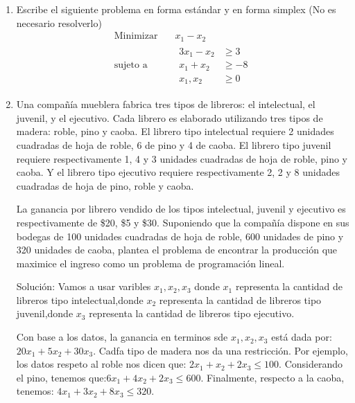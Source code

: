 \documentclass[twocolumn]{article}
\begin{document}
\begin{enumerate}
\item Escribe el siguiente problema en forma estándar y en forma simplex
(No es necesario resolverlo)
\begin{equation*}
\begin{aligned}
\text{Minimizar} \quad & x_{1}-x_{2}\\
\text{sujeto a} \quad &
  \begin{aligned}
   3x_{1}-x_{2} & \geq 3\\
   x_{1}+x_{2} &\geq -8\\
   x_{1},x_{2} &\geq 0
  \end{aligned}
\end{aligned}
\end{equation*}

\item Una compañía mueblera fabrica tres tipos de libreros: el
\guillemotleft{}intelectual\guillemotright{}, el \guillemotleft{}juvenil\guillemotright{}, y el \guillemotleft{}ejecutivo\guillemotright{}. Cada librero es
elaborado utilizando tres tipos de madera: roble, pino y caoba. El
librero tipo \guillemotleft{}intelectual\guillemotright{} requiere 2 unidades cuadradas de hoja de
roble, 6 de pino y 4 de caoba. El librero tipo \guillemotleft{}juvenil\guillemotright{} requiere
respectivamente 1, 4 y 3 unidades cuadradas de hoja de roble, pino
y caoba. Y el librero tipo \guillemotleft{}ejecutivo\guillemotright{} requiere respectivamente 2,
2 y 8 unidades cuadradas de hoja de pino, roble y caoba.

La ganancia por librero vendido de los tipos \guillemotleft{}intelectual\guillemotright{},
\guillemotleft{}juvenil\guillemotright{} y \guillemotleft{}ejecutivo\guillemotright{} es respectivamente de \$20, \$5 y
\$30. Suponiendo que la compañía dispone en sus bodegas de 100
unidades cuadradas de hoja de roble, 600 unidades de pino y 320
unidades de caoba, plantea el problema de encontrar la producción
que maximice el ingreso como un problema de programación lineal.

Solución: Vamos a usar varibles $x_1,x_2,x_3$ donde $x_1$ representa
la cantidad de libreros tipo intelectual,donde $x_2$ representa
la cantidad de libreros tipo juvenil,donde $x_3$ representa
la cantidad de libreros tipo ejecutivo.

Con base a los datos, la ganancia en terminos sde $x_1,x_2,x_3$ está
dada por: $20x_1+5x_2+30x_3$. Cadfa tipo de madera nos da una
restricción. Por ejemplo, los datos respeto al roble nos dicen que:
$2x_1+x_2+2x_3\leq 100$. Considerando el pino, tenemos
que:$6x_1+4x_2+2x_3\leq 600$. Finalmente, respecto a la caoba,
tenemos: $4x_1+3x_2+8x_3\leq 320$.


\end{enumerate}
\end{document}
